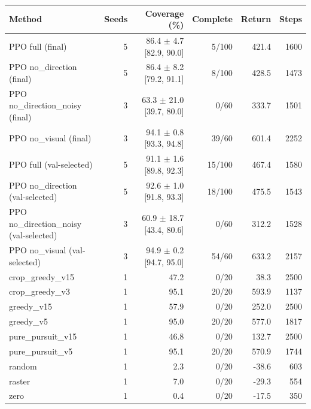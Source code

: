 \begin{tabular}{lrrrrr}
\toprule
Method & Seeds & Coverage (\%) & Complete & Return & Steps \\
\midrule
PPO full (final) & 5 & 86.4 $\pm$ 4.7 [82.9, 90.0] & 5/100 & 421.4 & 1600 \\
PPO no_direction (final) & 5 & 86.4 $\pm$ 8.2 [79.2, 91.1] & 8/100 & 428.5 & 1473 \\
PPO no_direction_noisy (final) & 3 & 63.3 $\pm$ 21.0 [39.7, 80.0] & 0/60 & 333.7 & 1501 \\
PPO no_visual (final) & 3 & 94.1 $\pm$ 0.8 [93.3, 94.8] & 39/60 & 601.4 & 2252 \\
PPO full (val-selected) & 5 & 91.1 $\pm$ 1.6 [89.8, 92.3] & 15/100 & 467.4 & 1580 \\
PPO no_direction (val-selected) & 5 & 92.6 $\pm$ 1.0 [91.8, 93.3] & 18/100 & 475.5 & 1543 \\
PPO no_direction_noisy (val-selected) & 3 & 60.9 $\pm$ 18.7 [43.4, 80.6] & 0/60 & 312.2 & 1528 \\
PPO no_visual (val-selected) & 3 & 94.9 $\pm$ 0.2 [94.7, 95.0] & 54/60 & 633.2 & 2157 \\
crop\_greedy\_v15 & 1 & 47.2 & 0/20 & 38.3 & 2500 \\
crop\_greedy\_v3 & 1 & 95.1 & 20/20 & 593.9 & 1137 \\
greedy\_v15 & 1 & 57.9 & 0/20 & 252.0 & 2500 \\
greedy\_v5 & 1 & 95.0 & 20/20 & 577.0 & 1817 \\
pure\_pursuit\_v15 & 1 & 46.8 & 0/20 & 132.7 & 2500 \\
pure\_pursuit\_v5 & 1 & 95.1 & 20/20 & 570.9 & 1744 \\
random & 1 & 2.3 & 0/20 & -38.6 & 603 \\
raster & 1 & 7.0 & 0/20 & -29.3 & 554 \\
zero & 1 & 0.4 & 0/20 & -17.5 & 350 \\
\bottomrule
\end{tabular}